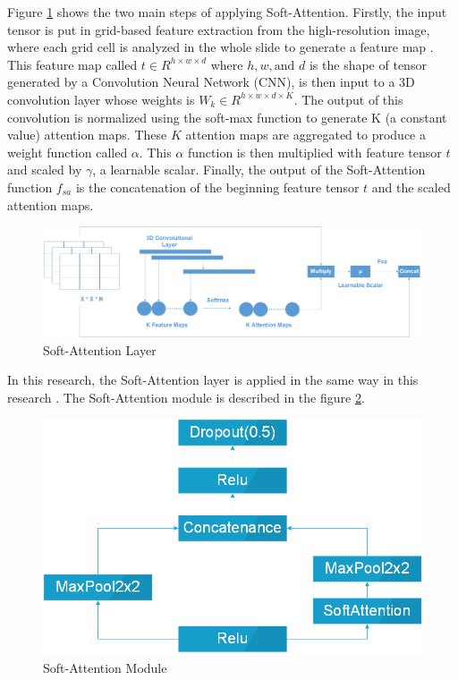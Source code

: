 \documentclass[sensors,article,submit,pdftex,moreauthors]{Definitions/mdpi}
\begin{document}
	Figure \ref{fig:soft-attention} shows the two main steps of applying Soft-Attention. Firstly, the input tensor is put in grid-based feature extraction from the high-resolution image, where each grid cell is analyzed in the whole slide to generate a feature map \cite{08513}. This feature map called $t \in R^{h \times w \times d}$ where $h, w, \text{and } d$ is the shape of tensor generated by a Convolution Neural Network (CNN), is then input to a 3D convolution layer whose weights is $W_k \in R^{h \times w \times d \times K}$. The output of this convolution is normalized using the soft-max function to generate K (a constant value) attention maps. These $K$ attention maps are aggregated to produce a weight function called $\alpha$. This $\alpha$ function is then multiplied with feature tensor $t$ and scaled by $\gamma$, a learnable scalar. Finally, the output of the Soft-Attention function $f_{sa}$ is the concatenation of the beginning feature tensor $t$ and the scaled attention maps. 
	
	\begin{figure}[H]
		\centering
		\includegraphics[width=1\linewidth]{Definitions/SoftAttention}
		\caption{Soft-Attention Layer}
		\label{fig:soft-attention}
	\end{figure}
	
	In this research, the Soft-Attention layer is applied in the same way in this research \cite{03358}. The Soft-Attention module is described in the figure \ref{fig:soft-attention-block}. 
	
	\begin{figure}[H]
		\centering
		\includegraphics[width=0.5\linewidth]{Definitions/SoftAttentionBlock}
		\caption{Soft-Attention Module}
		\label{fig:soft-attention-block}
	\end{figure}
	
\end{document}
